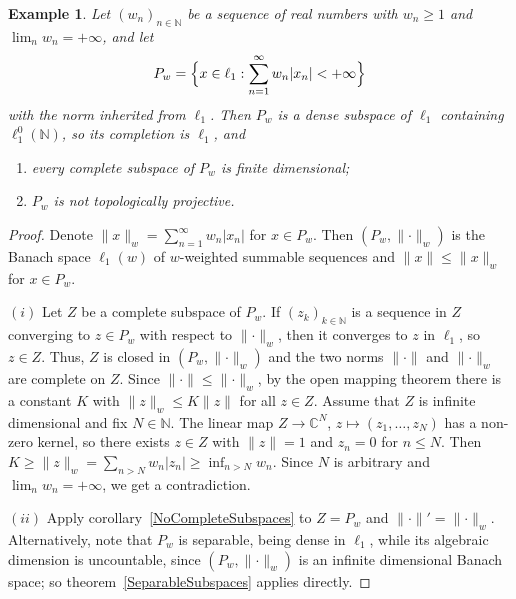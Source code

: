 \documentclass[12pt]{article}
\newtheorem{example}[theorem]{Example}
\newcommand{\lo}[1]{\ell_1^0(#1)}
\newcommand{\norm}[1]{\lVert #1\rVert}
\begin{document}
\begin{example}\label{WeightedExample} Let ${(w_n)}_{n\in\mathbb{N}}$ be a
    sequence of real numbers with $w_n\geq 1$ and $\lim_n w_n=+\infty$, and let
    \[
    P_w=\Bigl\{x\in\ell_1:\sum_{n=1}^\infty w_n|x_n|<+\infty\Bigr\}
    \]
    with the norm inherited from $\ell_1$. Then $P_w$ is a dense subspace of
    $\ell_1$ containing $\lo{\mathbb{N}}$, so its completion is $\ell_1$, and
    \begin{enumerate}[label = (\roman*)]
        \item every complete subspace of $P_w$ is finite dimensional;
        \item $P_w$ is not topologically projective.
    \end{enumerate}
\end{example}
\begin{proof} Denote $\norm{x}_w=\sum_{n=1}^\infty w_n|x_n|$ for $x\in P_w$.
    Then $(P_w,\norm{\cdot}_w)$ is the Banach space $\ell_1(w)$ of
    $w$-weighted summable sequences and $\norm{x}\leq\norm{x}_w$ for $x\in
    P_w$.

    $(i)$ Let $Z$ be a complete subspace of $P_w$. If ${(z_k)}_{k\in\mathbb{N}}$
    is a sequence in $Z$ converging to $z\in P_w$ with respect to
    $\norm{\cdot}_w$, then it converges to $z$ in $\ell_1$, so $z\in Z$. Thus,
    $Z$ is closed in $(P_w,\norm{\cdot}_w)$ and the two norms $\norm{\cdot}$
    and $\norm{\cdot}_w$ are complete on $Z$. Since $\norm{\cdot}\leq
    \norm{\cdot}_w$, by the open mapping theorem there is a constant $K$ with
    $\norm{z}_w\leq K\norm{z}$ for all $z\in Z$. Assume that $Z$ is infinite
    dimensional and fix $N\in\mathbb{N}$. The linear map $Z\to\mathbb{C}^N$,
    $z\mapsto(z_1,\ldots,z_N)$ has a non-zero kernel, so there exists $z\in
    Z$ with $\norm{z}=1$ and $z_n=0$ for $n\leq N$. Then
    $K\geq\norm{z}_w=\sum_{n>N}w_n|z_n|\geq\inf_{n>N}w_n$. Since $N$ is
    arbitrary and $\lim_n w_n=+\infty$, we get a contradiction.

    $(ii)$ Apply corollary~\ref{NoCompleteSubspaces} to $Z=P_w$ and
    $\norm{\cdot}'=\norm{\cdot}_w$. Alternatively, note that $P_w$ is
    separable, being dense in $\ell_1$, while its algebraic dimension is
    uncountable, since $(P_w,\norm{\cdot}_w)$ is an infinite dimensional
    Banach space; so theorem~\ref{SeparableSubspaces} applies directly.
\end{proof}

\end{document}
